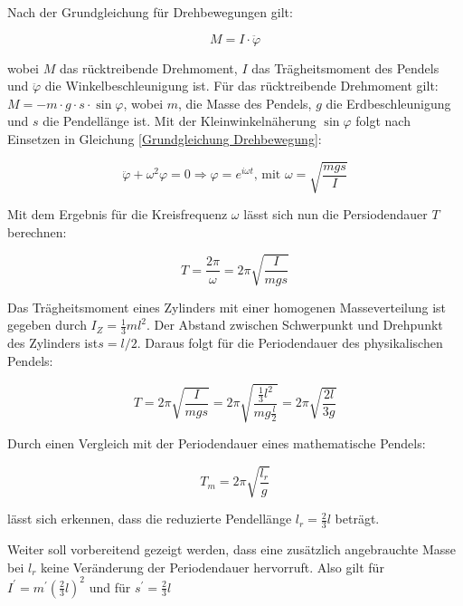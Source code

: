 Nach der Grundgleichung für Drehbewegungen gilt:

\begin{equation} \label{Grundgleichung Drehbewegung}
    M = I \cdot \ddot{\varphi}
\end{equation}

wobei $M$ das rücktreibende Drehmoment, $I$ das Trägheitsmoment des Pendels und $\ddot{\varphi}$ die Winkelbeschleunigung ist. Für das rücktreibende Drehmoment gilt: $M = -m \cdot g \cdot s \cdot \sin{\varphi}$, wobei $m$, die Masse des Pendels, $g$ die Erdbeschleunigung und $s$ die Pendellänge ist. Mit der Kleinwinkelnäherung $\sin{\varphi}$ folgt nach Einsetzen in Gleichung \ref{Grundgleichung Drehbewegung}:

\begin{equation} \label{Schwingungsgleichung eines physikalischen Pendels}
\ddot{\varphi} + \omega^2\varphi = 0
\Rightarrow \varphi = e^{i \omega t} \text{, mit } \omega = \sqrt{\frac{mgs}{I}}
\end{equation}

Mit dem Ergebnis für die Kreisfrequenz $\omega$ lässt sich nun die Persiodendauer $T$ berechnen:

\begin{equation}
    T = \frac{2\pi}{\omega} = 2 \pi \sqrt{\frac{I}{mgs}}
\end{equation}

Das Trägheitsmoment eines Zylinders mit einer homogenen Masseverteilung ist gegeben durch $I_Z = \frac{1}{3} ml^2$. Der Abstand zwischen Schwerpunkt und Drehpunkt des Zylinders ist$s = l/2$. Daraus folgt für die Periodendauer des physikalischen Pendels:

\begin{equation}
    T = 2 \pi \sqrt{\frac{I}{mgs}} = 2 \pi \sqrt{\frac{\frac{1}{3} l^2}{mg\frac{l}{2}}} = 2 \pi \sqrt{\frac{2l}{3g}}
\end{equation}

Durch einen Vergleich mit der Periodendauer eines mathematische Pendels:

\begin{equation} \label{Periodendauer mathematisches Pendel}
   T_m = 2 \pi \sqrt{\frac{l_r}{g}} 
\end{equation} 

lässt sich erkennen, dass die reduzierte Pendellänge $l_r = \frac{2}{3}l$ beträgt.

Weiter soll vorbereitend gezeigt werden, dass eine zusätzlich angebrauchte Masse bei $l_r$  keine Veränderung der Periodendauer hervorruft. Also gilt für $I^\prime = m^\prime (\frac{2}{3}l)^2$ und für $s^\prime = \frac{2}{3}l$

